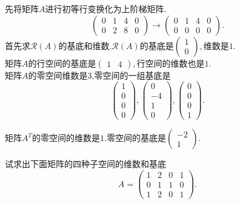 ﻿\documentclass{book} \usepackage{exsheets} \usepackage{xeCJK}
\begin{document}
\begin{solution}
  先将矩阵$A$进行初等行变换化为上阶梯矩阵.
$$
\begin{pmatrix}
  0&1&4&0\\
  0&2&8&0
\end{pmatrix}\to
\begin{pmatrix}
  0&1&4&0\\
  0&0&0&0
\end{pmatrix}.
$$                                     
首先求$\mathcal{R}(A)$的基底和维数.$\mathcal{R}(A)$的基底是$
\begin{pmatrix}
  1\\
  0
\end{pmatrix},
$维数是$1$.\\

矩阵$A$的行空间的基底是$
\begin{pmatrix}
  1&4
\end{pmatrix},
$行空间的维数也是$1$.\\

矩阵$A$的零空间维数是$3$,零空间的一组基底是
$$
\begin{pmatrix}
  1\\
  0\\
  0\\
  0
\end{pmatrix},
\begin{pmatrix}
  0\\
  -4\\
  1\\
  0
\end{pmatrix},
\begin{pmatrix}
  0\\
  0\\
  0\\
  1
\end{pmatrix}.
$$

矩阵$A^T$的零空间的维数是$1$.零空间的基底是$
\begin{pmatrix}
  -2\\
  1
\end{pmatrix}.  $
\end{solution}
\begin{question}
  试求出下面矩阵的四种子空间的维数和基底
$$
A=
\begin{pmatrix}
  1&2&0&1\\
  0&1&1&0\\
  1&2&0&1
\end{pmatrix}.
$$
\end{question}
\end{document}
